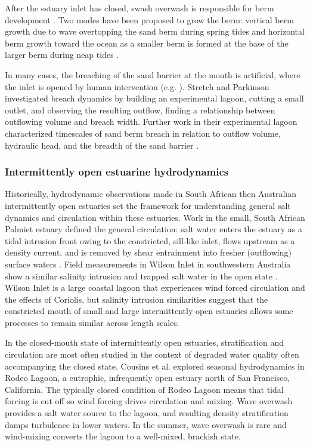 After the estuary inlet has closed, swash overwash is responsible for berm development \parencite{baldock_morphodynamic_2008}. Two modes have been proposed to grow the berm: vertical berm growth due to wave overtopping the sand berm during spring tides and horizontal berm growth toward the ocean as a smaller berm is formed at the base of the larger berm during neap tides \parencite{weir_beach_2006}. 

In many cases, the breaching of the sand barrier at the mouth is artificial, where the inlet is opened by human intervention (e.g. \cite{fortunato_morphological_2014, behrens_episodic_2013}). Stretch and Parkinson \parencite*{stretch_breaching_2006} investigated breach dynamics by building an experimental lagoon, cutting a small outlet, and observing the resulting outflow, finding a relationship between outflowing volume and breach width. Further work in their experimental lagoon characterized timescales of sand berm breach in relation to outflow volume, hydraulic head, and the breadth of the sand barrier \parencite{parkinson_breaching_2007}. 


\subsubsection{Intermittently open estuarine hydrodynamics}

Historically, hydrodynamic observations made in South African then Australian intermittently open estuaries set the framework for understanding general salt dynamics and circulation within these estuaries. Work in the small, South African Palmiet estuary defined the general circulation: salt water enters the estuary as a tidal intrusion front owing to the constricted, sill-like inlet, flows upstream as a density current, and is removed by shear entrainment into fresher (outflowing) surface waters \parencite{largier_stratified_1992}. Field measurements in Wilson Inlet in southwestern Australia show a similar salinity intrusion and trapped salt water in the open state \parencite{ranasinghe_circulation_1999}. Wilson Inlet is a large coastal lagoon that experiences wind forced circulation and the effects of Coriolis, but salinity intrusion similarities suggest that the constricted mouth of small and large intermittently open estuaries allows some processes to remain similar across length scales. 


In the closed-mouth state of intermittently open estuaries, stratification and circulation are most often studied in the context of degraded water quality often accompanying the closed state. Cousins et al. \parencite*{cousins_effects_2010} explored seasonal hydrodynamics in Rodeo Lagoon, a eutrophic, infrequently open estuary north of San Francisco, California. The typically closed condition of Rodeo Lagoon means that tidal forcing is cut off so wind forcing drives circulation and mixing. Wave overwash provides a salt water source to the lagoon, and resulting density stratification damps turbulence in lower waters. In the summer, wave overwash is rare and wind-mixing converts the lagoon to a well-mixed, brackish state.

